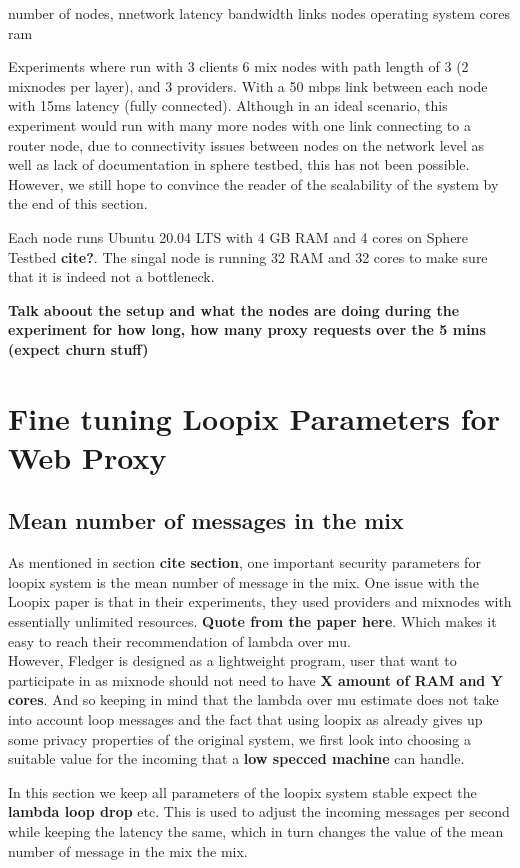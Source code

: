 \documentclass[a4paper,11pt,oneside]{report}
\begin{document}
number of nodes,
nnetwork latency bandwidth links
nodes operating system cores ram

Experiments where run with 3 clients 6 mix nodes with path length of 3 (2 mixnodes per layer), and 3 providers. With a 50 mbps link between each node with 15ms latency (fully connected). Although in an ideal scenario, this experiment would run with many more nodes with one link connecting to a router node, due to connectivity issues between nodes on the network level as well as lack of documentation in sphere testbed, this has not been possible. However, we still hope to convince the reader of the scalability of the system by the end of this section. 

Each node runs Ubuntu 20.04 LTS with 4 GB RAM and 4 cores on Sphere Testbed \textbf{cite?}. The singal node is running 32 RAM and 32 cores to make sure that it is indeed not a bottleneck.

\textbf{Talk aboout the setup and what the nodes are doing during the experiment for how long, how many proxy requests over the 5 mins (expect churn stuff)}


\section{Fine tuning Loopix Parameters for Web Proxy}
\subsection{Mean number of messages in the mix}
As mentioned in section \textbf{cite section}, one important security parameters for loopix system is the mean number of message in the mix. One issue with the Loopix paper is that in their experiments, they used providers and mixnodes with essentially unlimited resources. \textbf{Quote from the paper here}. Which makes it easy to reach their recommendation of lambda over mu. \\
However, Fledger is designed as a lightweight program, user that want to participate in as mixnode should not need to have \textbf{X amount of RAM and Y cores}. And so keeping in mind that the lambda over mu estimate does not take into account loop messages and the fact that using loopix as already gives up some privacy properties of the original system, we first look into choosing a suitable value for the incoming that a \textbf{low specced machine} can handle.

In this section we keep all parameters of the loopix system stable expect the \textbf{lambda loop drop} etc. This is used to adjust the incoming messages per second while keeping the latency the same, which in turn changes the value of the mean number of message in the mix the mix.
\end{document}
